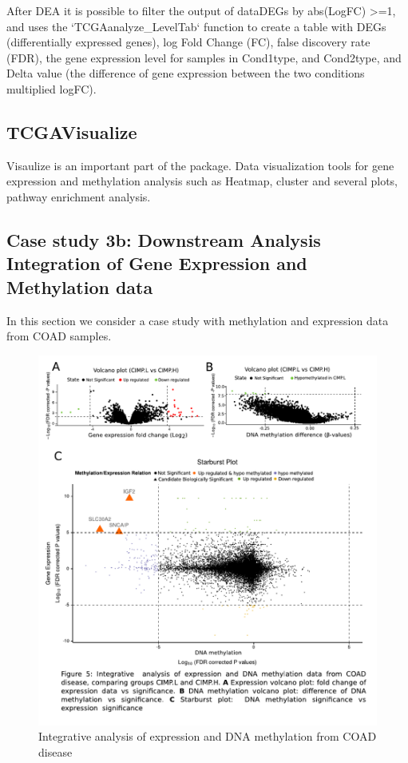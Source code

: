 After DEA it is possible to filter the output of dataDEGs by abs(LogFC) >=1, and uses the `TCGAanalyze\_LevelTab` function to create a table with DEGs (differentially expressed genes), log Fold Change (FC), false discovery rate (FDR), the gene expression level for samples in Cond1type, and Cond2type, and Delta value (the difference of gene expression between the two conditions multiplied logFC).

\subsection{TCGAVisualize}
Visaulize is an important part of the package.
Data visualization tools for gene expression and methylation analysis such as Heatmap, cluster and several plots, pathway enrichment analysis.

\subsection{Case study 3b: Downstream Analysis Integration of Gene Expression and Methylation data}


In this section we consider a case study with methylation and expression data from COAD samples. 


\begin{figure}
\centering
\includegraphics[width=.9\linewidth]{images/case3_improved2.pdf}

\caption{Integrative analysis of expression and DNA methylation from COAD disease}
\label{fig:workflow}
\end{figure}

\newpage